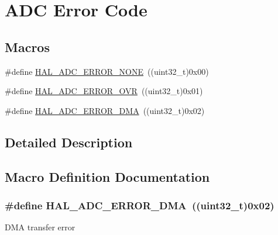 \hypertarget{group___a_d_c___error___code}{}\section{A\+DC Error Code}
\label{group___a_d_c___error___code}
\subsection*{Macros}
\begin{DoxyCompactItemize}
\item 
\#define \hyperlink{group___a_d_c___error___code_ga93b4576d46ee0f8c53b7d69f39778e38}{H\+A\+L\+\_\+\+A\+D\+C\+\_\+\+E\+R\+R\+O\+R\+\_\+\+N\+O\+NE}~((uint32\+\_\+t)0x00)
\item 
\#define \hyperlink{group___a_d_c___error___code_ga30ce24556ebd3c0341558c700a3b9add}{H\+A\+L\+\_\+\+A\+D\+C\+\_\+\+E\+R\+R\+O\+R\+\_\+\+O\+VR}~((uint32\+\_\+t)0x01)
\item 
\#define \hyperlink{group___a_d_c___error___code_gaea82628f53a8e30db3f3426922acf60f}{H\+A\+L\+\_\+\+A\+D\+C\+\_\+\+E\+R\+R\+O\+R\+\_\+\+D\+MA}~((uint32\+\_\+t)0x02)
\end{DoxyCompactItemize}


\subsection{Detailed Description}


\subsection{Macro Definition Documentation}
\subsubsection[{\texorpdfstring{H\+A\+L\+\_\+\+A\+D\+C\+\_\+\+E\+R\+R\+O\+R\+\_\+\+D\+MA}{HAL_ADC_ERROR_DMA}}]{\setlength{\rightskip}{0pt plus 5cm}\#define H\+A\+L\+\_\+\+A\+D\+C\+\_\+\+E\+R\+R\+O\+R\+\_\+\+D\+MA~((uint32\+\_\+t)0x02)}\hypertarget{group___a_d_c___error___code_gaea82628f53a8e30db3f3426922acf60f}{}\label{group___a_d_c___error___code_gaea82628f53a8e30db3f3426922acf60f}
D\+MA transfer error 
